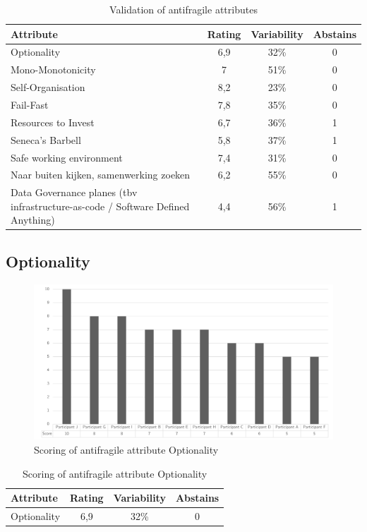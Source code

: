 \begin{table}[!h]
	\centering
	\begin{tabular}{p{}ccc}
		\toprule
		\textbf{Attribute} & \textbf{Rating} & \textbf{Variability} & \textbf{Abstains} \\
		\midrule
		Optionality & 6,9 & 32\% & 0 \\%
		Mono-Monotonicity & 7 & 51\% & 0 \\%
		Self-Organisation & 8,2 & 23\% & 0 \\%
		Fail-Fast & 7,8 & 35\% & 0 \\%
		Resources to Invest & 6,7 & 36\% & 1 \\%
		Seneca's Barbell & 5,8 & 37\% & 1 \\%
		Safe working environment & 7,4 & 31\% & 0 \\%
		Naar buiten kijken, samenwerking zoeken & 6,2 & 55\% & 0 \\%
		Data Governance planes (tbv infrastructure-as-code / Software Defined Anything) & 4,4 & 56\% & 1 \\%
		\bottomrule
	\end{tabular}%
	\caption{Validation of antifragile attributes}
	\label{tab:appvalidationofantifragileattributes}%
\end{table}%
\newpage
\subsection{Optionality}
\begin{figure}[h!]
	\centering
	\includegraphics[width=0.9\linewidth]{images/scoreafoptionality}
	\caption[Scoring of antifragile attribute Optionality]{Scoring of antifragile attribute Optionality}
	\label{fig:appscoringafoptionality}
\end{figure}
\begin{table}[h!]
	\centering
	\begin{tabular}{p{}ccc}
		\toprule
		\textbf{Attribute} & \textbf{Rating} & \textbf{Variability} & \textbf{Abstains} \\
		\midrule
		Optionality & 6,9 & 32\% & 0 \\%
		\bottomrule
	\end{tabular}%
	\caption[Scoring of antifragile attribute Optionality]{Scoring of antifragile attribute Optionality}
	\label{tab:appscoringafoptionality}%
\end{table}%
\newpage
